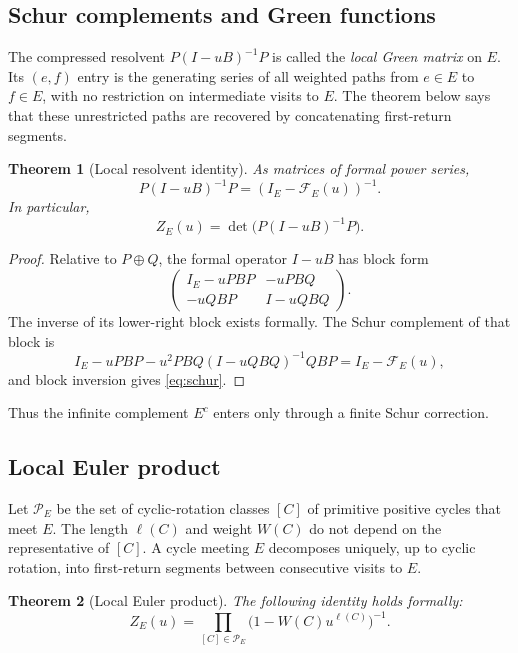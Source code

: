 \documentclass[11pt,reqno]{amsart}
\numberwithin{equation}{section}
\newtheorem{theorem}{Theorem}[section]
\theoremstyle{definition}
\theoremstyle{remark}
\newcommand{\cF}{\mathcal F}
\begin{document}
\subsection{Schur complements and Green functions}

The compressed resolvent $P(I-uB)^{-1}P$ is called the \emph{local Green
matrix} on $E$.  Its $(e,f)$ entry is the generating series of all weighted
paths from $e\in E$ to $f\in E$, with no restriction on intermediate visits
to $E$.  The theorem below says that these unrestricted paths are recovered by
concatenating first-return segments.

\begin{theorem}[Local resolvent identity]\label{thm:schur}
As matrices of formal power series,
\begin{equation}\label{eq:schur}
 P(I-uB)^{-1}P=(I_E-\cF_E(u))^{-1}.
\end{equation}
In particular,
\begin{equation}\label{eq:localdetgreen}
 Z_E(u)=\det\bigl(P(I-uB)^{-1}P\bigr).
\end{equation}
\end{theorem}

\begin{proof}
Relative to $P\oplus Q$, the formal operator $I-uB$ has block form
\[
 \begin{pmatrix}
 I_E-uPBP&-uPBQ\\
 -uQBP&I-uQBQ
 \end{pmatrix}.
\]
The inverse of its lower-right block exists formally.  The Schur complement of
that block is
\[
 I_E-uPBP-u^2PBQ(I-uQBQ)^{-1}QBP=I_E-\cF_E(u),
\]
and block inversion gives \eqref{eq:schur}.
\end{proof}

Thus the infinite complement $E^c$ enters only through a finite Schur
correction.

\subsection{Local Euler product}

Let $\mathcal P_E$ be the set of cyclic-rotation classes $[C]$ of primitive
positive cycles that meet $E$.  The length $\ell(C)$ and weight $W(C)$ do not
depend on the representative of $[C]$.  A cycle meeting $E$ decomposes
uniquely, up to cyclic rotation, into first-return segments between consecutive
visits to $E$.

\begin{theorem}[Local Euler product]\label{thm:localeuler}
The following identity holds formally:
\begin{equation}\label{eq:localeuler}
 Z_E(u)=\prod_{[C]\in\mathcal P_E}
 \bigl(1-W(C)u^{\ell(C)}\bigr)^{-1}.
\end{equation}
\end{theorem}
\end{document}
